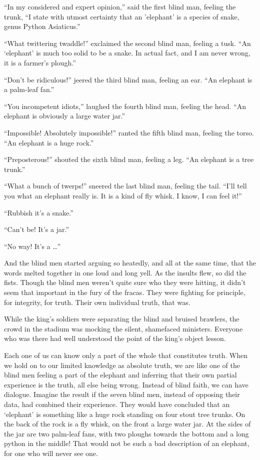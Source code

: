 \documentclass[11pt, openany]{book}
\begin{document}
“In my considered and expert opinion,” said the first blind man, feeling the trunk, “I state with utmost certainty that an ’elephant’ is a species of snake, genus Python Asiaticus.”

“What twittering twaddle!” exclaimed the second blind man, feeling a tusk. “An ‘elephant’ is much too solid to be a snake. In actual fact, and I am never wrong, it is a farmer’s plough.”

“Don’t be ridiculous!” jeered the third blind man, feeling an ear. “An elephant is a palm-leaf fan.”

“You incompetent idiots,” laughed the fourth blind man, feeling the head. “An elephant is obviously a large water jar.”

“Impossible! Absolutely impossible!” ranted the fifth blind man, feeling the torso. “An elephant is a huge rock.”

“Preposterous!” shouted the sixth blind man, feeling a leg. “An elephant is a tree trunk.”

“What a bunch of twerps!” sneered the last blind man, feeling the tail. “I’ll tell you what an elephant really is. It is a kind of fly whisk. I know, I can feel it!”

“Rubbish it’s a snake.”

“Can’t be! It’s a jar.”

“No way! It’s a …”

And the blind men started arguing so heatedly, and all at the same time, that the words melted together in one loud and long yell. As the insults flew, so did the fists. Though the blind men weren’t quite sure who they were hitting, it didn’t seem that important in the fury of the fracas. They were fighting for principle, for integrity, for truth. Their own individual truth, that was.

While the king’s soldiers were separating the blind and bruised brawlers, the crowd in the stadium was mocking the silent, shamefaced ministers. Everyone who was there had well understood the point of the king’s object lesson.

Each one of us can know only a part of the whole that constitutes truth. When we hold on to our limited knowledge as absolute truth, we are like one of the blind men feeling a part of the elephant and inferring that their own partial experience is the truth, all else being wrong. Instead of blind faith, we can have dialogue. Imagine the result if the seven blind men, instead of opposing their data, had combined their experience. They would have concluded that an ‘elephant’ is something like a huge rock standing on four stout tree trunks. On the back of the rock is a fly whisk, on the front a large water jar. At the sides of the jar are two palm-leaf fans, with two ploughs towards the bottom and a long python in the middle! That would not be such a bad description of an elephant, for one who will never see one.
\end{document}
